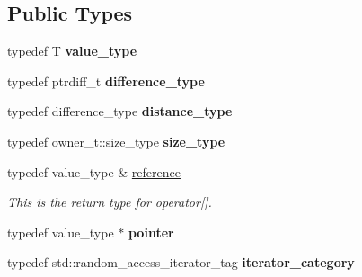 \subsection*{Public Types}
\begin{DoxyCompactItemize}
\item 
\mbox{\label{classGis__wkb__vector__const__iterator_aa6c88497a112ab9858e12c224f788171}} 
typedef T {\bfseries value\+\_\+type}
\item 
\mbox{\label{classGis__wkb__vector__const__iterator_ab96586abf3153ac0b42372d32402f78b}} 
typedef ptrdiff\+\_\+t {\bfseries difference\+\_\+type}
\item 
\mbox{\label{classGis__wkb__vector__const__iterator_a9ff4f2cfddf19eebd29b8bbfdcd50c5d}} 
typedef difference\+\_\+type {\bfseries distance\+\_\+type}
\item 
\mbox{\label{classGis__wkb__vector__const__iterator_a34e1c13d8e4f797cbc588dc145187ab6}} 
typedef owner\+\_\+t\+::size\+\_\+type {\bfseries size\+\_\+type}
\item 
\mbox{\label{classGis__wkb__vector__const__iterator_a320ffe7a48e9c6440eb76d321ff8c5a2}} 
typedef value\+\_\+type \& \mbox{\hyperlink{classGis__wkb__vector__const__iterator_a320ffe7a48e9c6440eb76d321ff8c5a2}{reference}}
\begin{DoxyCompactList}\small\item\em This is the return type for operator\mbox{[}\mbox{]}. \end{DoxyCompactList}\item 
\mbox{\label{classGis__wkb__vector__const__iterator_ae6b6cb93b1d718c31f104156bc061252}} 
typedef value\+\_\+type $\ast$ {\bfseries pointer}
\item 
\mbox{\label{classGis__wkb__vector__const__iterator_a764bab79eab9c9315d74e64553c49c48}} 
typedef std\+::random\+\_\+access\+\_\+iterator\+\_\+tag {\bfseries iterator\+\_\+category}
\end{DoxyCompactItemize}
